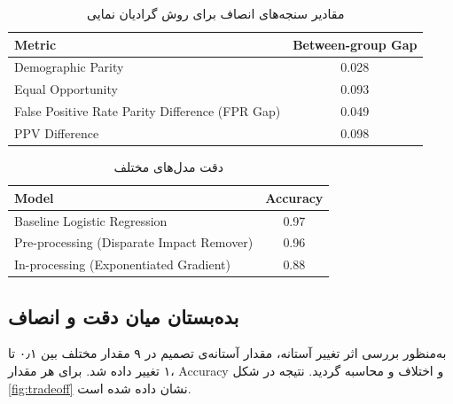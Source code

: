 \begin{table}[H]
	\centering
	\caption{مقادیر سنجه‌های انصاف برای روش ‌گرادیان نمایی   }
	\label{tab:fairness_expgrad}
	
	\begin{latin}
		\begin{tabular}{|lc|}
			\hline
			\textbf{Metric} & \textbf{Between-group Gap} \\
			\hline
			
			Demographic Parity & 0.028 \\
			
			Equal Opportunity & 0.093 \\
			
			False Positive Rate Parity Difference (FPR Gap) & 0.049 \\
			
			PPV Difference & 0.098 \\
			\hline
		\end{tabular}
	\end{latin}
	
\end{table}

\begin{table}[H]
	\centering
	\caption{دقت مدل‌های مختلف}
	\label{tab:model_accuracy}
	
	\begin{latin}
		\begin{tabular}{|lc|}
			\hline
			\textbf{Model} & \textbf{Accuracy} \\
			\hline
			
			Baseline Logistic Regression & 0.97 \\
			
			Pre-processing (Disparate Impact Remover) & 0.96 \\
			
			In-processing (Exponentiated Gradient) & 0.88 \\
			\hline
		\end{tabular}
	\end{latin}
	
\end{table}

\subsection{بده‌بستان میان دقت و انصاف}

به‌منظور بررسی اثر تغییر آستانه، مقدار آستانه‌ی تصمیم در ۹ مقدار مختلف بین ۰٫۱ تا ۱ تغییر داده شد. برای هر مقدار، Accuracy و اختلاف 
و 
محاسبه گردید. نتیجه در شکل \ref{fig:tradeoff} نشان داده شده است.

